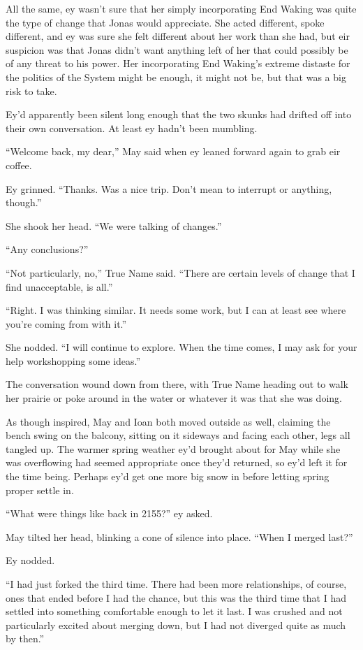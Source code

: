 All the same, ey wasn't sure that her simply incorporating End Waking was quite the type of change that Jonas would appreciate. She acted different, spoke different, and ey was sure she felt different about her work than she had, but eir suspicion was that Jonas didn't want anything left of her that could possibly be of any threat to his power. Her incorporating End Waking's extreme distaste for the politics of the System might be enough, it might not be, but that was a big risk to take.

Ey'd apparently been silent long enough that the two skunks had drifted off into their own conversation. At least ey hadn't been mumbling.

``Welcome back, my dear,'' May said when ey leaned forward again to grab eir coffee.

Ey grinned. ``Thanks. Was a nice trip. Don't mean to interrupt or anything, though.''

She shook her head. ``We were talking of changes.''

``Any conclusions?''

``Not particularly, no,'' True Name said. ``There are certain levels of change that I find unacceptable, is all.''

``Right. I was thinking similar. It needs some work, but I can at least see where you're coming from with it.''

She nodded. ``I will continue to explore. When the time comes, I may ask for your help workshopping some ideas.''

The conversation wound down from there, with True Name heading out to walk her prairie or poke around in the water or whatever it was that she was doing.

As though inspired, May and Ioan both moved outside as well, claiming the bench swing on the balcony, sitting on it sideways and facing each other, legs all tangled up. The warmer spring weather ey'd brought about for May while she was overflowing had seemed appropriate once they'd returned, so ey'd left it for the time being. Perhaps ey'd get one more big snow in before letting spring proper settle in.

``What were things like back in 2155?'' ey asked.

May tilted her head, blinking a cone of silence into place. ``When I merged last?''

Ey nodded.

``I had just forked the third time. There had been more relationships, of course, ones that ended before I had the chance, but this was the third time that I had settled into something comfortable enough to let it last. I was crushed and not particularly excited about merging down, but I had not diverged quite as much by then.''

